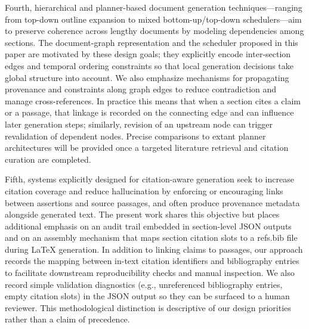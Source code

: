 \documentclass{article}%
\begin{document}
Fourth, hierarchical and planner-based document generation techniques—ranging from top-down outline expansion to mixed bottom-up/top-down schedulers—aim to preserve coherence across lengthy documents by modeling dependencies among sections. The document-graph representation and the scheduler proposed in this paper are motivated by these design goals; they explicitly encode inter-section edges and temporal ordering constraints so that local generation decisions take global structure into account. We also emphasize mechanisms for propagating provenance and constraints along graph edges to reduce contradiction and manage cross-references. In practice this means that when a section cites a claim or a passage, that linkage is recorded on the connecting edge and can influence later generation steps; similarly, revision of an upstream node can trigger revalidation of dependent nodes. Precise comparisons to extant planner architectures will be provided once a targeted literature retrieval and citation curation are completed.

Fifth, systems explicitly designed for citation-aware generation seek to increase citation coverage and reduce hallucination by enforcing or encouraging links between assertions and source passages, and often produce provenance metadata alongside generated text. The present work shares this objective but places additional emphasis on an audit trail embedded in section-level JSON outputs and on an assembly mechanism that maps section citation slots to a refs.bib file during LaTeX generation. In addition to linking claims to passages, our approach records the mapping between in-text citation identifiers and bibliography entries to facilitate downstream reproducibility checks and manual inspection. We also record simple validation diagnostics (e.g., unreferenced bibliography entries, empty citation slots) in the JSON output so they can be surfaced to a human reviewer. This methodological distinction is descriptive of our design priorities rather than a claim of precedence.
\end{document}
